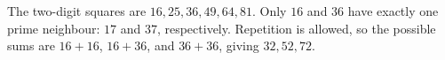 The two-digit squares are $16,25,36,49,64,81$. Only $16$ and $36$ have exactly one prime neighbour: $17$ and $37$, respectively. Repetition is allowed, so the possible sums are $16+16$, $16+36$, and $36+36$, giving $\boxed{32,52,72}$.
